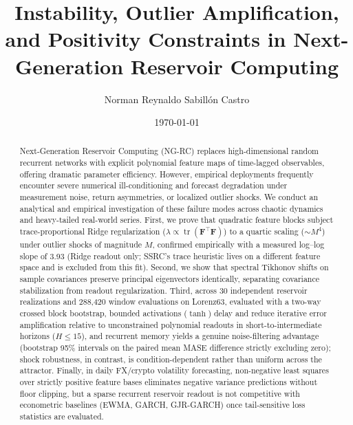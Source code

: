 \documentclass[aip,cha,reprint,amsmath,amssymb]{revtex4-2}
\begin{document}
\title{Instability, Outlier Amplification, and Positivity Constraints in Next-Generation Reservoir Computing}

\author{Norman Reynaldo Sabill{\'o}n Castro}

\date{\today}

\begin{abstract}
Next-Generation Reservoir Computing (NG-RC) replaces high-dimensional random recurrent networks with explicit polynomial feature maps of time-lagged observables, offering dramatic parameter efficiency. However, empirical deployments frequently encounter severe numerical ill-conditioning and forecast degradation under measurement noise, return asymmetries, or localized outlier shocks. We conduct an analytical and empirical investigation of these failure modes across chaotic dynamics and heavy-tailed real-world series. First, we prove that quadratic feature blocks subject trace-proportional Ridge regularization ($\lambda \propto \operatorname{tr}(\mathbf{F}^\top\mathbf{F})$) to a quartic scaling ($\sim M^4$) under outlier shocks of magnitude $M$, confirmed empirically with a measured log--log slope of 3.93 (Ridge readout only; SSRC's trace heuristic lives on a different feature space and is excluded from this fit). Second, we show that spectral Tikhonov shifts on sample covariances preserve principal eigenvectors identically, separating covariance stabilization from readout regularization. Third, across 30 independent reservoir realizations and 288,420 window evaluations on Lorenz63, evaluated with a two-way crossed block bootstrap, bounded activations ($\tanh$) delay and reduce iterative error amplification relative to unconstrained polynomial readouts in short-to-intermediate horizons ($H \le 15$), and recurrent memory yields a genuine noise-filtering advantage (bootstrap 95\% intervals on the paired mean MASE difference strictly excluding zero); shock robustness, in contrast, is condition-dependent rather than uniform across the attractor. Finally, in daily FX/crypto volatility forecasting, non-negative least squares over strictly positive feature bases eliminates negative variance predictions without floor clipping, but a sparse recurrent reservoir readout is not competitive with econometric baselines (EWMA, GARCH, GJR-GARCH) once tail-sensitive loss statistics are evaluated.
\end{abstract}
\end{document}
